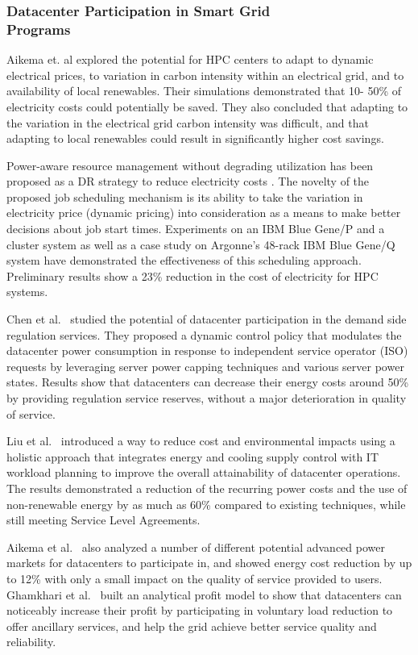 \subsubsection{Datacenter Participation in Smart Grid \\Programs}
Aikema et. al \cite{aikema_electrical_2011} explored the potential for HPC
centers to adapt to dynamic electrical prices, to variation in carbon intensity
within an electrical grid, and to availability of local renewables. Their
simulations demonstrated that 10- 50\% of electricity costs could potentially
be saved. They also concluded that adapting to the variation in the electrical
grid carbon intensity was difficult, and that adapting to local renewables could
result in significantly higher cost savings.

Power-aware resource management without degrading utilization has been proposed
as a DR strategy to reduce electricity costs
\cite{yang_integrating_2013,zhou_reducing_2013}. The novelty of the proposed job
scheduling mechanism is its ability to take the variation in electricity price
(dynamic pricing) into consideration as a means to make better decisions about
job start times. Experiments on an IBM Blue Gene/P and a cluster system as well
as a case study on Argonne's 48-rack IBM Blue Gene/Q system have demonstrated
the effectiveness of this scheduling approach. Preliminary results show a 23\%
reduction in the cost of electricity for HPC systems.

Chen et al.~\cite{chen2014aspdac} studied the potential of datacenter participation in the demand side regulation services. They proposed a dynamic control policy that modulates the datacenter power consumption in response to independent service operator (ISO) requests by leveraging server power capping techniques and various server power states. Results show that datacenters can decrease their energy costs around 50\% by providing regulation service reserves, without a major deterioration in quality of service.

Liu et al.~\cite{liu2012renewable} introduced a way to reduce cost and environmental impacts using a holistic approach that integrates energy and cooling supply control with IT workload planning to improve the overall attainability of datacenter operations. The results demonstrated a reduction of the recurring power costs and the use of non-renewable energy by as much as 60\% compared to existing techniques, while still meeting Service Level Agreements.

Aikema et al.~\cite{aikema2012data} also analyzed a number of different potential advanced power markets for datacenters to participate in, and showed energy cost reduction by up to 12\% with only a small impact on the quality of service provided to users. Ghamkhari et al.~\cite{ghamkhari2012data} built an analytical profit model to show that datacenters can noticeably increase their profit by participating in voluntary load reduction to offer ancillary services, and help the grid achieve better service quality and reliability. 